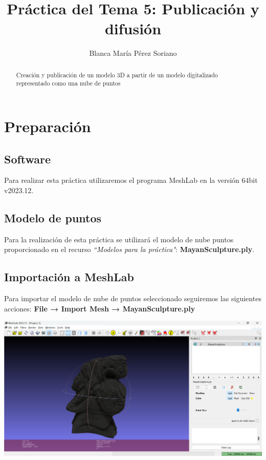 \documentclass[options]{article}
\title{Práctica del Tema 5: Publicación y difusión}
\author{Blanca María Pérez Soriano}
\begin{document}
\maketitle
\begin{abstract}
    \begin{center}
        Creación y publicación de un modelo 3D a partir de un modelo digitalizado representado como una nube de puntos
    \end{center}   
\end{abstract}

\pagebreak

\section{Preparación}
\subsection{Software}
Para realizar esta práctica utilizaremos el programa MeshLab en la versión 64bit v2023.12.
\subsection{Modelo de puntos}
Para la realización de esta práctica se utilizará el modelo de nube puntos proporcionado en el recurso \textit{``Modelos para la práctica"}: \textbf{MayanSculpture.ply}.
\subsection{Importación a MeshLab}
Para importar el modelo de nube de puntos seleccionado seguiremos las siguientes acciones: \textbf{File → Import Mesh → MayanSculpture.ply}
\begin{center}
    \includegraphics[scale=0.35]{images/presentacion_importacion.png}    
\end{center}
\end{document}
